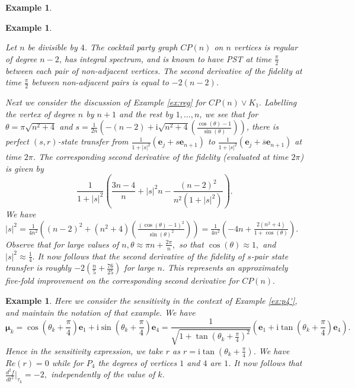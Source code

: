 \documentclass{article}
\numberwithin{equation}{section}
\newtheorem{ex}[lemma]{Example}
\newcommand{\be}{\mathbf e}
\newcommand{\bmu}{{\boldsymbol{\mu}}}
\def\ii{\mathrm{i}}
\begin{document}
{\begin{ex}
\end{ex}


\begin{ex}\label{ex:sensitivity_improvement}{\rm{
Let $n$ be divisible by $4$. The cocktail party graph $CP(n)$ on $n$ vertices is regular of degree $n-2$, has integral spectrum, and is known to have PST at time $\frac{\pi}{2}$ between each pair of non-adjacent vertices. The second derivative of the fidelity at time $\frac{\pi}{2}$ between non-adjacent pairs is equal to $-2(n-2)$. 

Next we consider the discussion of Example \ref{ex:reg} for $CP(n)\vee K_1.$ Labelling the vertex of degree $n$ by $n+1$ and the rest by $1, \ldots, n$, we see that for $\theta = \pi \sqrt{n^2+4}$ and 
$s=\frac{1}{2n}\left(-(n-2) + \ii \sqrt{n^2+4}\left(\frac{\cos (\theta)-1}{\sin(\theta)}\right)\right)$, there is perfect $(s,r)$-state transfer from $\frac{1}{1+|s|^2}(\be_j+s\be_{n+1}) $
to $\frac{1}{1+|s|^2}(\be_j+\overline{s}\be_{n+1} )$ at time $2\pi$. The corresponding second derivative of the fidelity (evaluated at time $2\pi$) is given by $$\frac{1}{1+|s|^2} \left(\frac{3n-4}{n} + |s|^2n -\frac{(n-2)^2}{n^2(1+|s|^2)}\right).$$ We have $|s|^2 = \frac{1}{4n^2}\left((n-2)^2+(n^2+4)\left(\frac{(\cos (\theta)-1)^2}{\sin(\theta)^2}\right)\right) = \frac{1}{4n^2}\left( -4n +\frac{2(n^2+4)}{1+\cos(\theta)}\right). $ Observe that for large values of $n, \theta \approx \pi n + \frac{2\pi}{n},$ so that $\cos(\theta) \approx 1,$ and $|s|^2 \approx \frac{1}{4}.  $ It now follows that the second derivative of the fidelity of $s$-pair state transfer is roughly $-2(\frac{n}{5} + \frac{76}{25})$ for large $n.$ This represents an approximately five-fold improvement on the corresponding second derivative for $CP(n).$

}}
    
\end{ex}

\begin{ex}{\rm{ Here we consider the sensitivity in the context of Example \ref{ex:p4'}, and maintain the notation of that example. We have $$\bmu_k = \cos\left(\theta_k+ \frac{\pi}{4}\right)\be_1+ \ii \sin\left(\theta_k+\frac{\pi}{4}\right)\be_4 = \frac{1}{\sqrt{1+\tan\left(\theta_k+\frac{\pi}{4}\right)^2}}(\be_1+ \ii \tan\left(\theta_k+\frac{\pi}{4}\right)\be_4).$$ Hence in the sensitivity expression, we take $r$ as $r=\ii \tan\left(\theta_k+\frac{\pi}{4}\right)$. We have  $Re(r)=0$ while for $P_4$ the degrees of vertices $1$ and $4$ are $1$. It now follows that $\frac{d^2 f}{d t^2}\big|_{\tau_k}=-2,$ independently of the value of $k$. 
}}
    

\end{ex}}
\end{document}
